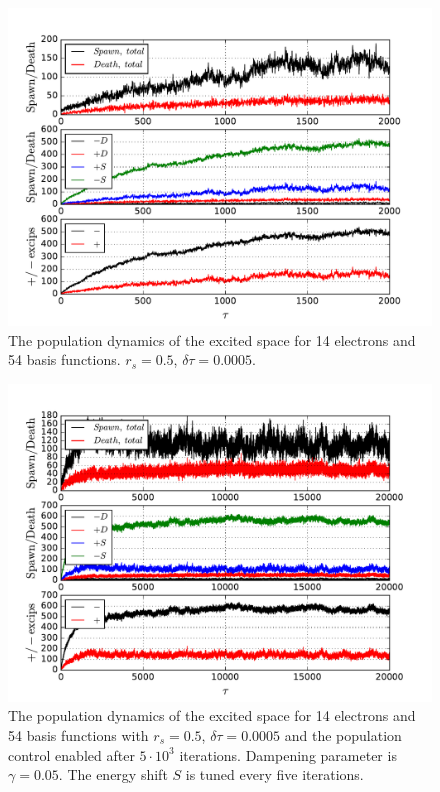 \documentclass[twoside,english]{uiofysmaster}
\begin{document}
\begin{landscape}
	
	\begin{figure}[ht!]
		\centering
		\includegraphics[width=0.8\linewidth]{platFind}
		\caption{The population dynamics of the excited space for 14 electrons and 54 basis functions. $r_s=0.5$, $\delta \tau=0.0005$.}
		\label{fig:platFind}
	\end{figure}
	
\end{landscape}

\begin{landscape}
	
	\begin{figure}[ht!]
		\centering
		\includegraphics[width=0.8\linewidth]{platFindStune}
		\caption{The population dynamics of the excited space for 14 electrons and 54 basis functions with $r_s=0.5$, $\delta \tau=0.0005$ and the population control enabled after $5\cdot 10^3$ iterations. Dampening parameter is $\gamma = 0.05$. The energy shift $S$ is tuned every five iterations.}
		\label{fig:platFindStune}
	\end{figure}
	
\end{landscape}
\end{document}

